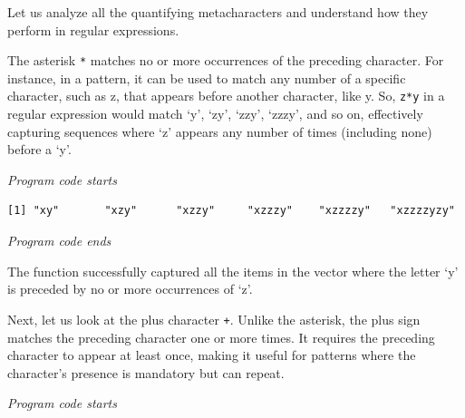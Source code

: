 Let us analyze all the quantifying metacharacters and understand how
they perform in regular expressions.

The asterisk \texttt{*} matches no or more occurrences of the
preceding character. For instance, in a pattern, it can be used to match
any number of a specific character, such as z, that appears before
another character, like y. So, \texttt{z*y} in a regular expression
would match `y', `zy', `zzy', `zzzy', and so on, effectively capturing
sequences where `z' appears any number of times (including none) before a `y'.

\emph{Program code starts}

\begin{Shaded}
\begin{Highlighting}[]
\NormalTok{(} \NormalTok{)}
\end{Highlighting}
\end{Shaded}

\begin{verbatim}
[1] "xy"       "xzy"      "xzzy"     "xzzzy"    "xzzzzy"   "xzzzzyzy"
\end{verbatim}

\emph{Program code ends}

The function successfully captured all the items in the vector where the
letter `y' is preceded by no or more occurrences of `z'.

Next, let us look at the plus character \texttt{+}. Unlike the
asterisk, the plus sign matches the preceding character one or more
times. It requires the preceding character to appear at least once,
making it useful for patterns where the character's presence is
mandatory but can repeat.

\emph{Program code starts}

\begin{Shaded}
\begin{Highlighting}[]
\NormalTok{(} \NormalTok{)}
\end{Highlighting}
\end{Shaded}

